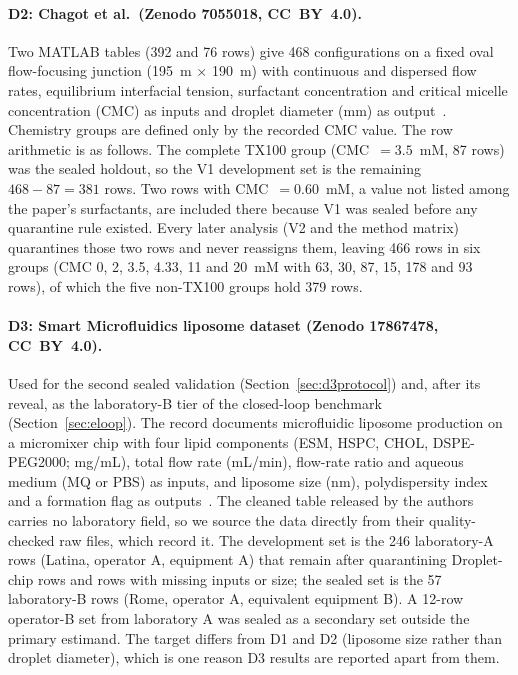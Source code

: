 \documentclass[11pt,a4paper]{article}
\newcommand{\um}{\textmu m}
\newcommand{\tox}{TX100}
\begin{document}
\paragraph{D2: Chagot et al.\ (Zenodo 7055018, CC~BY~4.0).} Two MATLAB tables
(392 and 76 rows) give 468 configurations on a fixed oval flow-focusing
junction (195~\um{} $\times$ 190~\um{}) with continuous and dispersed flow
rates, equilibrium interfacial tension, surfactant concentration and critical
micelle concentration (CMC) as inputs and droplet diameter (mm) as
output~\cite{chagot2022}. Chemistry groups are defined only by the recorded
CMC value. The row arithmetic is as follows. The complete \tox{} group
(CMC~$=3.5$~mM, 87 rows) was the sealed holdout, so the V1 development set is
the remaining $468-87=381$ rows. Two rows with CMC~$=0.60$~mM, a value not
listed among the paper's surfactants, are included there because V1 was
sealed before any quarantine rule existed. Every later analysis (V2 and the method matrix)
quarantines those two rows and never reassigns them, leaving 466 rows in six
groups (CMC 0, 2, 3.5, 4.33, 11 and 20~mM with 63, 30, 87, 15, 178 and 93
rows), of which the five non-\tox{} groups hold 379 rows.

\paragraph{D3: Smart Microfluidics liposome dataset (Zenodo 17867478,
CC~BY~4.0).} Used for the second sealed validation
(Section~\ref{sec:d3protocol}) and, after its reveal, as the laboratory-B tier
of the closed-loop benchmark (Section~\ref{sec:eloop}). The record documents microfluidic liposome
production on a micromixer chip with four lipid components (ESM, HSPC, CHOL,
DSPE-PEG2000; mg/mL), total flow rate (mL/min), flow-rate ratio and aqueous
medium (MQ or PBS) as inputs, and liposome size (nm), polydispersity index
and a formation flag as outputs~\cite{smartmicrofluidics2026}. The cleaned
table released by the authors carries no laboratory field, so we source the
data directly from their quality-checked raw files, which record it. The
development set is the 246 laboratory-A rows (Latina, operator A,
equipment A) that remain after quarantining Droplet-chip rows and rows with
missing inputs or size; the sealed set is the 57 laboratory-B rows (Rome,
operator A, equivalent equipment B). A 12-row operator-B set from laboratory A was sealed as a
secondary set outside the primary estimand. The target differs from D1 and D2
(liposome size rather than droplet diameter), which is one reason D3 results
are reported apart from them.
\end{document}
